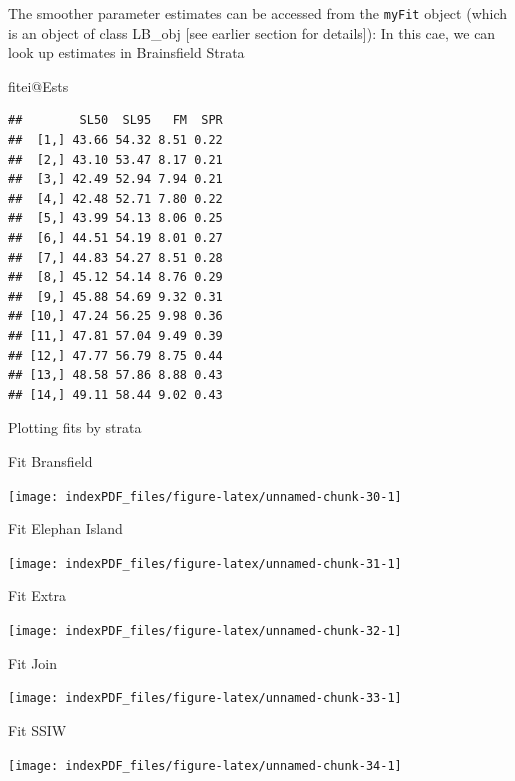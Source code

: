\documentclass[
]{article}
\newenvironment{Shaded}{\begin{snugshade}}{\end{snugshade}}
\newcommand{\NormalTok}[1]{#1}
\newcommand{\SpecialCharTok}[1]{\textcolor[rgb]{0.00,0.00,0.00}{#1}}
\begin{document}
The smoother parameter estimates can be accessed from the \texttt{myFit}
object (which is an object of class LB\_obj {[}see earlier section for
details{]}): In this cae, we can look up estimates in Brainsfield Strata

\begin{Shaded}
\begin{Highlighting}[]
\NormalTok{fitei}\SpecialCharTok{@}\NormalTok{Ests}
\end{Highlighting}
\end{Shaded}

\begin{verbatim}
##        SL50  SL95   FM  SPR
##  [1,] 43.66 54.32 8.51 0.22
##  [2,] 43.10 53.47 8.17 0.21
##  [3,] 42.49 52.94 7.94 0.21
##  [4,] 42.48 52.71 7.80 0.22
##  [5,] 43.99 54.13 8.06 0.25
##  [6,] 44.51 54.19 8.01 0.27
##  [7,] 44.83 54.27 8.51 0.28
##  [8,] 45.12 54.14 8.76 0.29
##  [9,] 45.88 54.69 9.32 0.31
## [10,] 47.24 56.25 9.98 0.36
## [11,] 47.81 57.04 9.49 0.39
## [12,] 47.77 56.79 8.75 0.44
## [13,] 48.58 57.86 8.88 0.43
## [14,] 49.11 58.44 9.02 0.43
\end{verbatim}

Plotting fits by strata

Fit Bransfield

\begin{center}\texttt{[image: indexPDF\_files/figure-latex/unnamed-chunk-30-1]} \end{center}

Fit Elephan Island

\begin{center}\texttt{[image: indexPDF\_files/figure-latex/unnamed-chunk-31-1]} \end{center}

Fit Extra

\begin{center}\texttt{[image: indexPDF\_files/figure-latex/unnamed-chunk-32-1]} \end{center}

Fit Join

\begin{center}\texttt{[image: indexPDF\_files/figure-latex/unnamed-chunk-33-1]} \end{center}

Fit SSIW

\begin{center}\texttt{[image: indexPDF\_files/figure-latex/unnamed-chunk-34-1]} \end{center}
\end{document}
